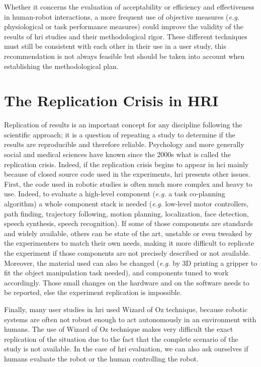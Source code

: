 \documentclass[a4paper,11pt,twoside]{StyleThese}
\begin{document}
Whether it concerns the evaluation of acceptability or efficiency and effectiveness in human-robot interactions, a more frequent use of objective measures (\textit{e.g.} physiological or task performance measures) could improve the validity of the results of \acrshort{hri} studies and their methodological rigor. These different techniques must still be consistent with each other in their use in a user study, this recommendation is not always feasible but should be taken into account when establishing the methodological plan.

\section{The Replication Crisis in HRI}
\label{sec:replication}

Replication of results is an important concept for any discipline following the scientific approach; it is a question of repeating a study to determine if the results are reproducible and therefore reliable. Psychology and more generally social and medical sciences have known since the 2000s what is called the replication crisis.
Indeed, if the replication crisis begins to appear in \acrshort{hci} \cite{echtler2018open} mainly because of closed source code used in the experiments, \acrshort{hri} presents other issues. First, the code used in robotic studies is often much more complex and heavy to use. Indeed, to evaluate a high-level component (\textit{e.g.} a task co-planning algorithm) a whole component stack is needed (\textit{e.g.} low-level motor controllers, path finding, trajectory following, motion planning, localization, face detection, speech synthesis, speech recognition). If some of those components are standards and widely available, others can be state of the art, unstable or even tweaked by the experimenters to match their own needs, making it more difficult to replicate the experiment if those components are not precisely described or not available. Moreover, the material used can also be changed (\textit{e.g.} by 3D printing a gripper to fit the object manipulation task needed), and components tuned to work accordingly. Those small changes on the hardware and on the software needs to be reported, else the experiment replication is impossible.

Finally, many user studies in \acrshort{hri} used Wizard of Oz technique, because robotic systems are often not robust enough to act autonomously in an environment with humans. The use of Wizard of Oz technique makes very difficult the exact replication of the situation due to the fact that the complete scenario of the study is not available. 
In the case of \acrshort{hri} evaluation, we can also ask ourselves if humans evaluate the robot or the human controlling the robot.
\end{document}
